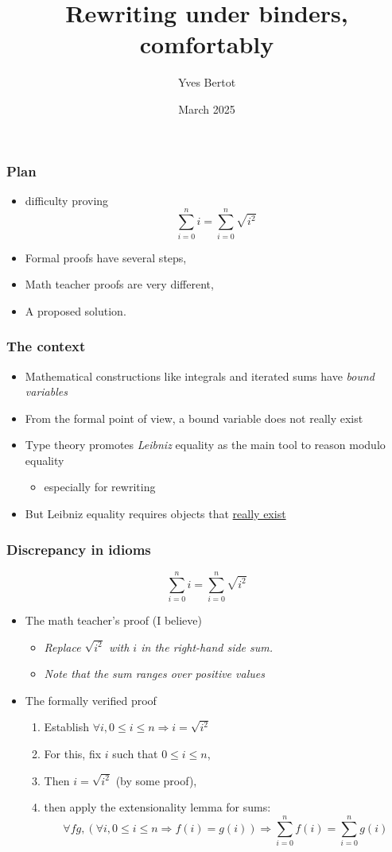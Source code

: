 \documentclass[compress]{beamer}
\title{Rewriting under binders, comfortably}
\author{Yves Bertot}
\date{March 2025}
\begin{document}
\maketitle
\begin{frame}
\frametitle{Plan}
\begin{itemize}
\item difficulty proving \[\sum_{i = 0}^{n} i = \sum_{i = 0}^{n} \sqrt{i^2}\]
\item Formal proofs have several steps, 
\item Math teacher proofs are very different,
\item A proposed solution.
\end{itemize}
\end{frame}
\begin{frame}
\frametitle{The context}
\begin{itemize}
\item Mathematical constructions like integrals and iterated sums have
{\em bound variables}
\item From the formal point of view, a bound variable does not really exist
\item Type theory promotes {\em Leibniz} equality as the main tool
to reason modulo equality
\begin{itemize}
\item especially for rewriting
\end{itemize}
\item But Leibniz equality requires objects that \underline{really exist}
\end{itemize}
\end{frame}
\begin{frame}
\frametitle{Discrepancy in idioms}
\[\sum_{i = 0}^{n} i = \sum_{i = 0}^{n} \sqrt{i ^ 2}\]
\begin{itemize}
\item The math teacher's proof (I believe)
\begin{itemize}
\item {\em Replace \(\sqrt{i^2}\) with \(i\) in the right-hand side sum.}
\item {\em Note that the sum ranges over positive values}
\end{itemize}
\item The formally verified proof
\begin{enumerate}
\item Establish \(\forall i, 0 \leq i \leq n \Rightarrow i = \sqrt{i ^ 2}\)
\item For this, fix \(i\) such that \(0 \leq i \leq n\),
\item Then \(i = \sqrt{i ^ 2}\) (by some proof),
\item then apply the extensionality lemma for sums:
\[\forall f g, (\forall i, 0 \leq i \leq n \Rightarrow f(i) = g(i)) \Rightarrow
\sum_{i = 0}^{n} f(i) = \sum_{i = 0}^{n} g(i)\]
\end{enumerate}
\end{itemize}
\end{frame}
\end{document}
